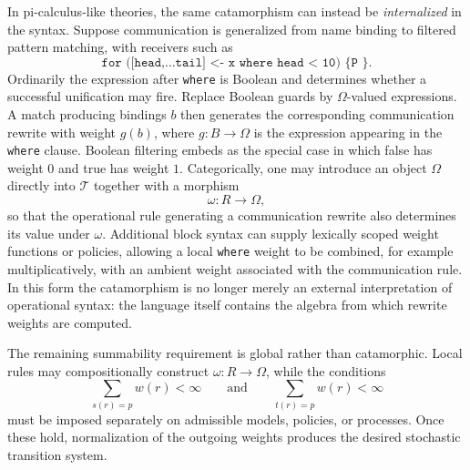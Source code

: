 \documentclass[10pt]{article}
\newcommand{\T}{\mathcal{T}}
\begin{document}
In pi-calculus-like theories, the same catamorphism can instead be
\emph{internalized} in the syntax.  Suppose communication is generalized from
name binding to filtered pattern matching, with receivers such as
\[
\texttt{for ([head,\ldots tail] <- x where head < 10) \{ P \}}.
\]
Ordinarily the expression after \texttt{where} is Boolean and determines
whether a successful unification may fire.  Replace Boolean guards by
$\Omega$-valued expressions.  A match producing bindings $b$ then generates
the corresponding communication rewrite with weight $g(b)$, where
$g:B\to\Omega$ is the expression appearing in the \texttt{where} clause.
Boolean filtering embeds as the special case in which false has weight $0$
and true has weight $1$.  Categorically, one may introduce an object $\Omega$
directly into $\T$ together with a morphism
\[
\omega:R\to\Omega,
\]
so that the operational rule generating a communication rewrite also
determines its value under $\omega$.  Additional block syntax can supply
lexically scoped weight functions or policies, allowing a local
\texttt{where} weight to be combined, for example multiplicatively, with an
ambient weight associated with the communication rule.  In this form the
catamorphism is no longer merely an external interpretation of operational
syntax: the language itself contains the algebra from which rewrite weights
are computed.

The remaining summability requirement is global rather than catamorphic.
Local rules may compositionally construct $\omega:R\to\Omega$, while the
conditions
\[
\sum_{s(r)=p} w(r)<\infty
\qquad\text{and}\qquad
\sum_{t(r)=p} w(r)<\infty
\]
must be imposed separately on admissible models, policies, or processes.
Once these hold, normalization of the outgoing weights produces the desired
stochastic transition system.
\end{document}
